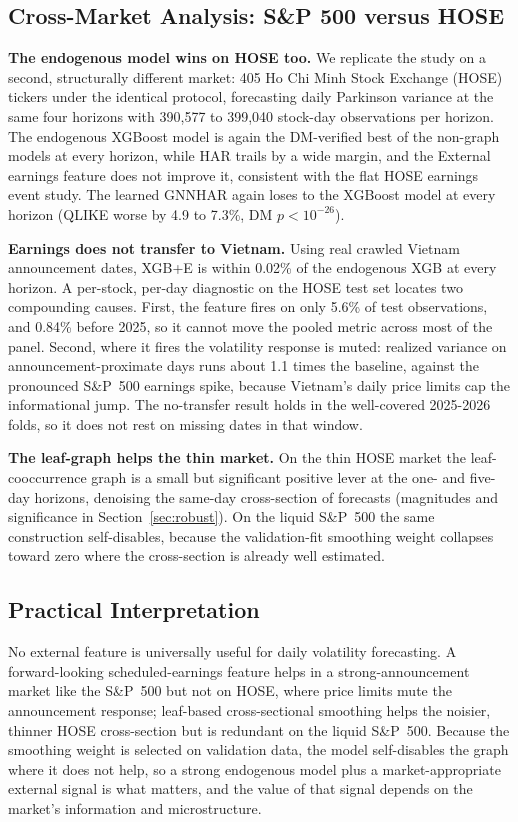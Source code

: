 \documentclass[runningheads]{llncs}
\begin{document}
\subsection{Cross-Market Analysis: S\&P 500 versus HOSE}\label{sec:hose}
\textbf{The endogenous model wins on HOSE too.} We replicate the study on a second, structurally
different market: 405 Ho Chi Minh Stock Exchange (HOSE) tickers under the identical protocol,
forecasting daily Parkinson variance at the same four horizons with 390{,}577 to 399{,}040 stock-day
observations per horizon. The endogenous XGBoost model is again the DM-verified best of the non-graph
models at every horizon, while HAR trails by a wide margin, and the External earnings feature does not
improve it, consistent with the flat HOSE earnings event study. The learned GNNHAR again loses to the
XGBoost model at every horizon (QLIKE worse by 4.9 to 7.3\%, DM $p<10^{-26}$).

\textbf{Earnings does not transfer to Vietnam.} Using real crawled Vietnam announcement dates, XGB+E is
within 0.02\% of the endogenous XGB at every horizon. A per-stock, per-day diagnostic on the HOSE
test set locates two compounding causes. First, the feature fires on only 5.6\% of test observations,
and 0.84\% before 2025, so it cannot move the pooled metric across most of the panel. Second, where it
fires the volatility response is muted: realized variance on announcement-proximate days runs about
1.1 times the baseline, against the pronounced S\&P~500 earnings spike, because Vietnam's daily price
limits cap the informational jump. The no-transfer result holds in the well-covered 2025-2026 folds,
so it does not rest on missing dates in that window.

\textbf{The leaf-graph helps the thin market.} On the thin HOSE market the leaf-cooccurrence graph is a
small but significant positive lever at the one- and five-day horizons, denoising the same-day
cross-section of forecasts (magnitudes and significance in Section~\ref{sec:robust}). On the liquid
S\&P~500 the same construction self-disables, because the validation-fit smoothing weight collapses
toward zero where the cross-section is already well estimated.

\subsection{Practical Interpretation}
No external feature is universally useful for daily volatility forecasting. A forward-looking
scheduled-earnings feature helps in a strong-announcement market like the S\&P~500 but not on HOSE, where
price limits mute the announcement response; leaf-based cross-sectional smoothing helps the noisier,
thinner HOSE cross-section but is redundant on the liquid S\&P~500. Because the smoothing weight is
selected on validation data, the model self-disables the graph where it does not help, so a strong
endogenous model plus a market-appropriate external signal is what matters, and the value of that signal
depends on the market's information and microstructure.
\end{document}
